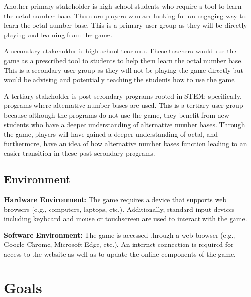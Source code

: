 \documentclass{article}
\begin{document}
Another primary stakeholder is high-school students who require a tool to learn the octal number base. These are players who are looking for an engaging way to learn the octal number base. This is a primary user group as they will be directly playing and learning from the game.

A secondary stakeholder is high-school teachers. These teachers would use the game as a prescribed tool to students to help them learn the octal number base. This is a secondary user group as they will not be playing the game directly but would be advising and potentially teaching the students how to use the game.

A tertiary stakeholder is post-secondary programs rooted in STEM; specifically, programs where alternative number bases are used. This is a tertiary user group because although the programs do not use the game, they benefit from new students who have a deeper understanding of alternative number bases. Through the game, players will have gained a deeper understanding of octal, and furthermore, have an idea of how alternative number bases function leading to an easier transition in these post-secondary programs.

\subsection{Environment}

\textbf{Hardware Environment:} The game requires a device that supports web browsers (e.g., computers, laptops, etc.). Additionally, standard input devices including keyboard and mouse or touchscreen are used to interact with the game.

\noindent \textbf{Software Environment:} The game is accessed through a web browser (e.g., Google Chrome, Microsoft Edge, etc.). An internet connection is required for access to the website as well as to update the online components of the game.

\section{Goals}
\end{document}
